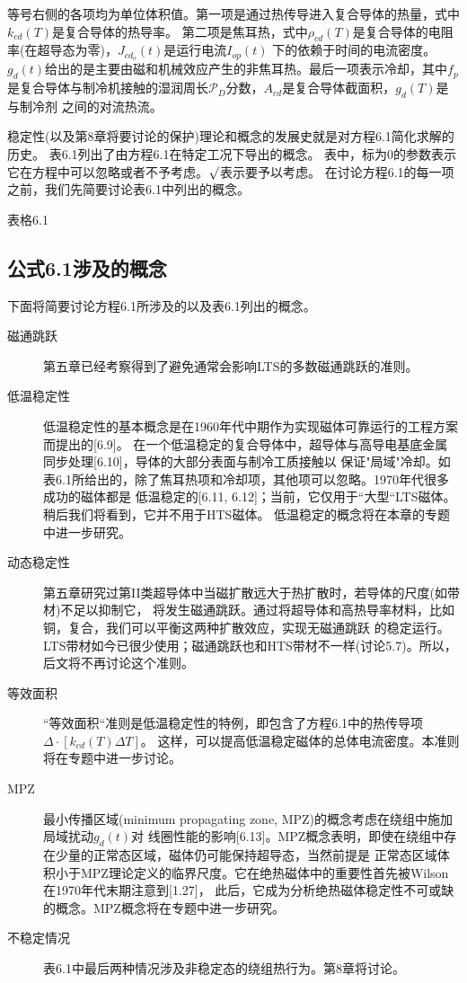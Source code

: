 等号右侧的各项均为单位体积值。第一项是通过热传导进入复合导体的热量，式中$k_{cd}(T)$是复合导体的热导率。
第二项是焦耳热，式中$\rho_{cd}(T)$是复合导体的电阻率(在超导态为零)，$J_{cd_o}(t)$是运行电流$I_{op}(t)$
下的依赖于时间的电流密度。$g_d(t)$给出的是主要由磁和机械效应产生的非焦耳热。最后一项表示冷却，其中$f_p$
是复合导体与制冷机接触的湿润周长$\mathcal{P}_D$分数，$A_{cd}$是复合导体截面积，$g_d(T)$是与制冷剂
之间的对流热流。

稳定性(以及第8章将要讨论的保护)理论和概念的发展史就是对方程6.1简化求解的历史。
表6.1列出了由方程6.1在特定工况下导出的概念。
表中，标为0的参数表示它在方程中可以忽略或者不予考虑。$\surd$表示要予以考虑。
在讨论方程6.1的每一项之前，我们先简要讨论表6.1中列出的概念。

表格6.1

\subsection{公式6.1涉及的概念}
下面将简要讨论方程6.1所涉及的以及表6.1列出的概念。
\begin{description}
  \item[磁通跳跃] 第五章已经考察得到了避免通常会影响LTS的多数磁通跳跃的准则。
  \item[低温稳定性] 低温稳定性的基本概念是在1960年代中期作为实现磁体可靠运行的工程方案而提出的[6.9]。
  在一个低温稳定的复合导体中，超导体与高导电基底金属同步处理[6.10]，导体的大部分表面与制冷工质接触以
  保证"局域"冷却。如表6.1所给出的，除了焦耳热项和冷却项，其他项可以忽略。1970年代很多成功的磁体都是
  低温稳定的[6.11, 6.12]；当前，它仅用于``大型``LTS磁体。稍后我们将看到，它并不用于HTS磁体。
  低温稳定的概念将在本章的专题中进一步研究。
  \item[动态稳定性] 第五章研究过第II类超导体中当磁扩散远大于热扩散时，若导体的尺度(如带材)不足以抑制它，
  将发生磁通跳跃。通过将超导体和高热导率材料，比如铜，复合，我们可以平衡这两种扩散效应，实现无磁通跳跃
  的稳定运行。LTS带材如今已很少使用；磁通跳跃也和HTS带材不一样(讨论5.7)。所以，后文将不再讨论这个准则。
  \item[等效面积] ``等效面积``准则是低温稳定性的特例，即包含了方程6.1中的热传导项$\Delta\cdot[k_{cd}(T)\Delta T]$。
  这样，可以提高低温稳定磁体的总体电流密度。本准则将在专题中进一步讨论。
  \item[MPZ] 最小传播区域(minimum propagating zone, MPZ)的概念考虑在绕组中施加局域扰动$g_d(t)$对
  线圈性能的影响[6.13]。MPZ概念表明，即使在绕组中存在少量的正常态区域，磁体仍可能保持超导态，当然前提是
  正常态区域体积小于MPZ理论定义的临界尺度。它在绝热磁体中的重要性首先被Wilson在1970年代末期注意到[1.27]，
  此后，它成为分析绝热磁体稳定性不可或缺的概念。MPZ概念将在专题中进一步研究。  
  \item[不稳定情况] 表6.1中最后两种情况涉及非稳定态的绕组热行为。第8章将讨论。
\end{description}

